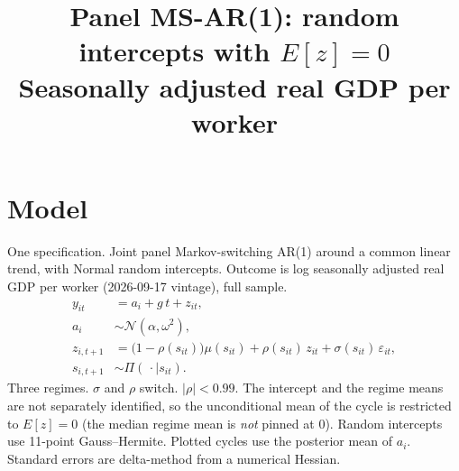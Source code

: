 \documentclass[11pt]{article}
\title{Panel MS-AR(1): random intercepts with $E[z]=0$\\[0.4em]\large Seasonally adjusted real GDP per worker}
\author{}
\date{}
\begin{document}
\maketitle
\section{Model}
One specification. Joint panel Markov-switching AR(1) around a common linear trend, with Normal random intercepts. Outcome is log seasonally adjusted real GDP per worker (2026-09-17 vintage), full sample.
\begin{align}
y_{it} &= a_i + g\, t + z_{it}, \\
a_i &\sim \mathcal{N}(\alpha,\omega^2), \\
z_{i,t+1} &= \bigl(1-\rho(s_{it})\bigr)\mu(s_{it}) + \rho(s_{it})\, z_{it} + \sigma(s_{it})\,\varepsilon_{it}, \\
s_{i,t+1} &\sim \Pi(\,\cdot\mid s_{it}).
\end{align}
Three regimes. $\sigma$ and $\rho$ switch. $|\rho|<0.99$. The intercept and the regime means are not separately identified, so the unconditional mean of the cycle is restricted to $E[z]=0$ (the median regime mean is \emph{not} pinned at 0). Random intercepts use 11-point Gauss--Hermite. Plotted cycles use the posterior mean of $a_i$. Standard errors are delta-method from a numerical Hessian.
\clearpage
\end{document}

